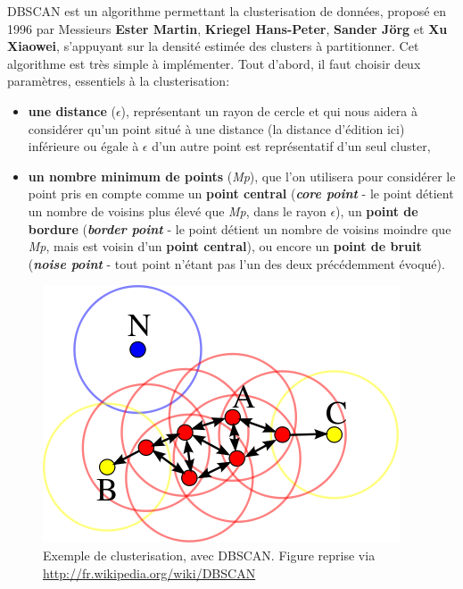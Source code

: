 \documentclass[pdftex,12pt,a4paper]{report}
\begin{document}
\begin{spacing}{1.2}
DBSCAN est un algorithme permettant la clusterisation de données, proposé en 1996 par Messieurs \textbf{Ester Martin}, \textbf{Kriegel Hans-Peter}, \textbf{Sander Jörg} et \textbf{Xu Xiaowei}, s'appuyant sur la densité estimée des clusters à partitionner.
Cet algorithme est très simple à implémenter.
\newline
Tout d'abord, il faut choisir deux paramètres, essentiels à la clusterisation:
\begin{itemize}
\item{\textbf{une distance} ($\epsilon$), représentant un rayon de cercle et qui nous aidera à considérer qu'un point situé à une distance (la distance d'édition ici) inférieure ou égale à $\epsilon$ d'un autre point est représentatif d'un seul cluster},
\item{\textbf{un nombre minimum de points} (\textit{Mp}), que l'on utilisera pour considérer le point pris en compte comme un \textbf{point central} (\textit{\textbf{core point}} - le point détient un nombre de voisins plus élevé que \textit{Mp}, dans le rayon $\epsilon$), un \textbf{point de bordure} (\textit{\textbf{border point}} - le point détient un nombre de voisins moindre que \textit{Mp}, mais est voisin d'un \textbf{point central}), ou encore un \textbf{point de bruit} (\textit{\textbf{noise point}} - tout point n'étant pas l'un des deux précédemment évoqué).}
\end{itemize}

\begin{figure}[H]
\begin{center}
	\includegraphics[scale=0.45]{img/400px-DBSCAN-Illustration.png}
\end{center}
\caption{Exemple de clusterisation, avec DBSCAN. Figure reprise via \url{http://fr.wikipedia.org/wiki/DBSCAN}}
\label{fig:dbscan}
\end{figure}


\end{spacing}
\end{document}

